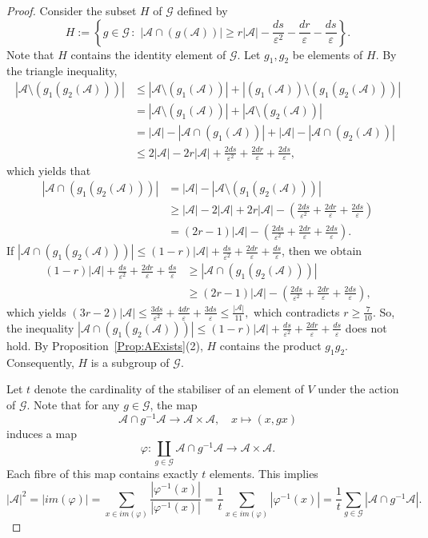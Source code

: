 \documentclass[ALCO,Unicode,published]{cedram}
\newcommand{\mo}{{-1}}
\newcommand{\calG}{\ensuremath{\mathcal{G}}}
\newcommand{\scrA}{\ensuremath{\mathscr{A}}}
\begin{document}
\begin{proof}
Consider the subset $H$ of $\calG$ defined by
$$H  :=
\left\{
g\in \calG \,:\,\, |\scrA \cap  (g(\scrA))| \geq r|\scrA| - \frac{ds}{\varepsilon^2} 
- \frac{dr}{\varepsilon}
- \frac{ds}{\varepsilon}
\right\}.$$
Note that $H$ contains the identity element of $\calG$. Let $g_1, g_2$ be elements of $H$. By the triangle inequality, 
\begin{align*}
|\scrA \setminus (g_1(g_2(\scrA)))| 
& \leq |\scrA \setminus (g_1(\scrA)) | + |(g_1(\scrA)) \setminus (g_1(g_2(\scrA)))| \\
& =  |\scrA \setminus  (g_1(\scrA)) | + |\scrA  \setminus (g_2(\scrA)) |\\
& = |\scrA | -  |\scrA \cap (g_1(\scrA))  | + |\scrA | - |\scrA  \cap (g_2(\scrA)) |\\
& \leq 2|\scrA| - 2r |\scrA| + \frac{2ds}{\varepsilon^2}  + \frac{2dr}{\varepsilon} 
+\frac{2ds}{\varepsilon} ,
\end{align*}
which yields that  
\begin{align*}
|\scrA \cap (g_1(g_2(\scrA)))| 
& = |\scrA | - |\scrA \setminus (g_1(g_2(\scrA)))| \\
& \geq |\scrA | - 2|\scrA| + 2r |\scrA| - \left(\frac{2ds}{\varepsilon^2} +\frac{2dr}{\varepsilon} + \frac{2ds}{\varepsilon} \right)\\
& = (2r - 1) |\scrA| - \left(\frac{2ds}{\varepsilon^2} + \frac{2dr}{\varepsilon} +\frac{2ds}{\varepsilon} \right).
\end{align*}
If $|\scrA \cap (g_1(g_2(\scrA)))| \leq (1-r) |\scrA| + \frac{ds}{\varepsilon^2} + \frac{2dr}\varepsilon +\frac{ds}{\varepsilon}$, then we obtain 
\begin{align*}
(1-r) |\scrA| + \frac{ds}{\varepsilon^2} + \frac{2dr}\varepsilon + \frac{ds}{\varepsilon}
&\geq |\scrA \cap (g_1(g_2(\scrA)))| \\
&\geq  (2r - 1) |\scrA| - \left(\frac{2ds}{\varepsilon^2} + \frac{2dr}{\varepsilon} + \frac{2ds}{\varepsilon} \right),
\end{align*}
which yields
$(3r-2)
|\scrA| 
\leq \frac{3ds}{\varepsilon^2} + \frac{4dr}{\varepsilon} + \frac{3ds}{\varepsilon} 
\leq \frac {|\scrA|}{ 11},
$
which contradicts $ r \geq \frac 7{10}$. 
So, the inequality 
$|\scrA \cap (g_1(g_2(\scrA)))| \leq (1-r) |\scrA|
+ \frac{ds}{\varepsilon^2} + \frac{2dr}\varepsilon + \frac{ds}{\varepsilon}$
does not hold. By Proposition~\ref{Prop:AExists}(2), $H$ contains the product $g_1g_2$. Consequently, $H$ is a subgroup of $\calG$. 

Let $t$ denote the cardinality of the stabiliser of an element of $V$ under the action of $\calG$. Note that for any $g\in \calG$, the map
$$\scrA\cap g^\mo \scrA \to \scrA\times \scrA, \quad 
x\mapsto (x, gx)$$ 
induces a map 
$$\varphi: \coprod _{g\in \calG} \scrA\cap g^\mo \scrA \to \scrA\times \scrA.$$
Each fibre of this map contains exactly $t$ elements. This implies 
$$
|\scrA|^2
= |im(\varphi)|
= \sum_{x\in im(\varphi) } \frac{|\varphi^\mo (x)|} {|\varphi^\mo (x)|}
= \frac 1t \sum_{x\in im(\varphi)} |\varphi^\mo (x)|
= \frac 1t \sum_{g\in \calG} |\scrA\cap g^\mo \scrA|.$$


\end{proof}
\end{document}
